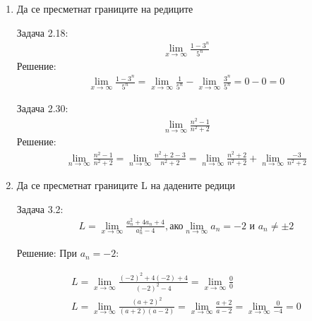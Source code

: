 \documentclass[a4paper, 20pt, fleqn, border=2pt]{article}
\begin{document}
\begin{enumerate}
\par

    \item Да се пресметнат границите на редиците
\par
\par

Задача 2.18:
\begin{equation}
\begin{split}
    \lim_{x\to\infty}\frac{1-3^n}{5^n}
\end{split}
\end{equation}
Решение:
\begin{equation}
\begin{split}
    \lim_{x\to\infty}\frac{1-3^n}{5^n} = \lim_{x\to\infty}\frac{1}{5^n} - \lim_{x\to\infty}\frac{3^n}{5^n} = 0 - 0 = 0
\end{split}
\end{equation}

\par

Задача 2.30:
\begin{equation}
\begin{split}
    \lim_{n\to\infty}\frac{n^2-1}{n^2+2}
\end{split}
\end{equation}
Решение:
\begin{equation}
\begin{split}
    \lim_{n\to\infty}\frac{n^2-1}{n^2+2} = \lim_{n\to\infty}\frac{n^2+2-3}{n^2+2} = \lim_{n\to\infty}\frac{n^2+2}{n^2+2}+\lim_{n\to\infty}\frac{-3}{n^2+2}
\end{split}
\end{equation}


    \item Да се пресметнат границите L на дадените редици
\par
\par

Задача 3.2:
\begin{equation}
\begin{split}
    L = \lim_{x\to\infty}\frac{a^2_n+4a_n+4}{a^2_n-4}, \text{ако} \lim_{n\to\infty}a_n=-2 \text{ и } a_n \neq \pm 2
\end{split}
\end{equation}


Решение: 
При $a_n = -2$:

\begin{equation}
\begin{split}
    L = \lim_{x\to\infty}\frac{(-2)^2+4(-2)+4}{(-2)^2-4} = \lim_{x\to\infty}\frac{0}{0} \\
    L = \lim_{x\to\infty}\frac{(a+2)^2}{(a+2)(a-2)} = \lim_{x\to\infty}\frac{a+2}{a-2} = \lim_{x\to\infty}\frac{0}{-4} = 0
\end{split}
\end{equation}


\end{enumerate}
\end{document}
